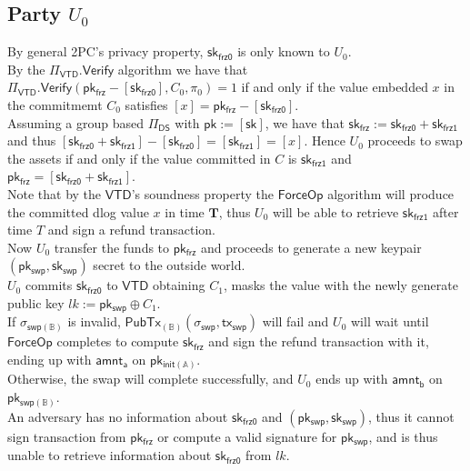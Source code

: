 \documentclass{article}      	%
\begin{document}
\subsection{Party $U_0$}

By general 2PC's privacy property, $\mathsf{sk_{frz0}}$ is only known to $U_0$. \\
By the $\Pi_{\mathsf{VTD}}.\mathsf{Verify}$ algorithm we have that $\Pi_{\mathsf{VTD}}.\mathsf{Verify}(\mathsf{pk_{frz}} - [\mathsf{sk_{frz0}}], C_0, \pi_0) = 1$ if and only if the value embedded $x$ in the commitmemt $C_0$ satisfies $[x] =  \mathsf{pk_{frz}} - [\mathsf{sk_{frz0}}]$. \\
Assuming a group based $\Pi_{\mathsf{DS}}$ with $\mathsf{pk} := [\mathsf{sk}]$, we have that $\mathsf{sk_{frz}} := \mathsf{sk_{frz0}} + \mathsf{sk_{frz1}}$ and thus $[\mathsf{sk_{frz0}} + \mathsf{sk_{frz1}}] - [\mathsf{sk_{frz0}}] = [\mathsf{sk_{frz1}}] = [x] $. Hence $U_0$ proceeds to swap the assets if and only if the value committed in $C$ is $\mathsf{sk_{frz1}}$ and $\mathsf{pk_{frz}} = [\mathsf{sk_{frz0}} + \mathsf{sk_{frz1}}]$.   \\
Note that by the $\mathsf{VTD}$'s soundness property the $\mathsf{ForceOp}$ algorithm will produce the committed dlog value $x$ in time $\textbf{T}$, thus $U_0$ will be able to retrieve  $\mathsf{sk_{frz1}}$ after time $T$ and sign a refund transaction. \\
Now $U_0$ transfer the funds to $\mathsf{pk_{frz}}$ and proceeds to generate a new keypair $(\mathsf{pk_{swp}}, \mathsf{sk_{swp}})$ secret to the outside world. \\
$U_0$ commits $\mathsf{sk_{frz0}}$ to $\mathsf{VTD}$ obtaining $C_1$, masks the value with the newly generate public key $ lk := \mathsf{pk_{swp}} \oplus C_1 $. \\
If $\sigma_{\mathsf{swp(\mathbb{B})}}$ is invalid, $\mathsf{PubTx}_{(\mathbb{B})}(\sigma_{\mathsf{swp}}, \mathsf{tx_{swp}})$ will fail and $U_0$ will wait until $\mathsf{ForceOp}$ completes to compute $\mathsf{sk_{frz}}$ and sign the refund transaction with it, ending up with $\mathsf{amnt_a}$ on $\mathsf{pk_{init(\mathbb{A})}}$. \\
Otherwise, the swap will complete successfully, and $U_0$ ends up with $\mathsf{amnt_b}$ on $\mathsf{pk_{swp(\mathbb{B})}}$. \\
An adversary has no information about $\mathsf{sk_{frz0}}$ and $(\mathsf{pk_{swp}}, \mathsf{sk_{swp}})$, thus it cannot sign transaction from $\mathsf{pk_{frz}}$ or compute a valid signature for $\mathsf{pk_{swp}}$, and is thus unable to retrieve information about $\mathsf{sk_{frz0}}$ from $lk$.\\
\end{document}
